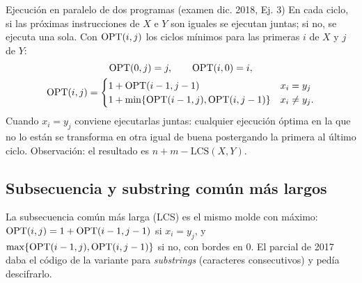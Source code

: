 \begin{problema}{Ejecución en paralelo de dos programas (examen dic. 2018, Ej. 3)}
En cada ciclo, si las próximas instrucciones de $X$ e $Y$ son iguales se
ejecutan juntas; si no, se ejecuta una sola. Con $\mathrm{OPT}(i,j)$ los ciclos
mínimos para las primeras $i$ de $X$ y $j$ de $Y$:
\begin{gather*}
\mathrm{OPT}(0,j)=j,\qquad \mathrm{OPT}(i,0)=i,\\
\mathrm{OPT}(i,j)=\begin{cases}1+\mathrm{OPT}(i-1,j-1) & x_i=y_j\\ 1+\min\{\mathrm{OPT}(i-1,j),\mathrm{OPT}(i,j-1)\} & x_i\ne y_j.\end{cases}
\end{gather*}
Cuando $x_i=y_j$ conviene ejecutarlas juntas: cualquier ejecución óptima en
la que no lo están se transforma en otra igual de buena postergando la
primera al último ciclo. Observación: el resultado es $n+m-\mathrm{LCS}(X,Y)$.
\end{problema}

\subsection{Subsecuencia y substring común más largos}

La subsecuencia común más larga (LCS) es el mismo molde con máximo:
$\mathrm{OPT}(i,j)=1+\mathrm{OPT}(i-1,j-1)$ si $x_i=y_j$, y
$\max\{\mathrm{OPT}(i-1,j),\mathrm{OPT}(i,j-1)\}$ si no, con bordes en 0. El parcial de 2017
daba el código de la variante para \emph{substrings} (caracteres
consecutivos) y pedía descifrarlo.


